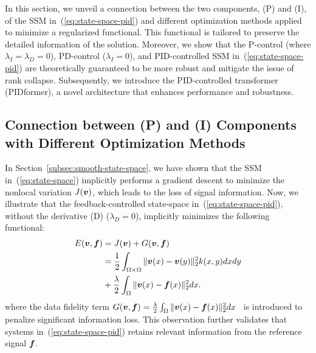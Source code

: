 \vspace{-3mm}
In this section, we unveil a connection between the two components, (P) and (I), of the SSM in~(\ref{eq:state-space-pid}) and different optimization methods applied to minimize a regularized functional. This functional is tailored to preserve the detailed information of the solution. Moreover, we show that the P-control (where $\lambda_I = \lambda_D = 0$), PD-control ($\lambda_I = 0$), and PID-controlled SSM in~(\ref{eq:state-space-pid}) are theoretically guaranteed to be more robust and mitigate the issue of rank collapse. Subsequently, we introduce the PID-controlled transformer (PIDformer), a novel architecture that enhances performance and robustness.

\vspace{-3mm}
\subsection{Connection between (P) and (I) Components with Different Optimization Methods} 

In Section~\ref{subsec:smooth-state-space}, we have shown that the SSM in~(\ref{eq:state-space}) implicitly performs a gradient descent to minimize the nonlocal variation $J({\bm v})$, which leads to the loss of signal information. Now, we illustrate that the feedback-controlled state-space in~(\ref{eq:state-space-pid}), without the derivative (D) ($\lambda_D = 0$), implicitly minimizes the following functional:
\begin{equation}
  \begin{aligned}
    \label{eqn:energy-functional}
    E({\bm v}, {\bm f}) &= J({\bm v}) + G({\bm v},{\bm f}) \\ 
    &= \frac{1}{2} \int_{\Omega \times \Omega} \|{\bm v}(x) - {\bm v}(y)\|_2^2 k(x, y)dx dy \\
    &+ \frac{\lambda}{2}  \int_{\Omega} \|{\bm v}(x) - {\bm f}(x)\|_2^2 dx.
    \end{aligned}  
\end{equation}
where the data fidelity term $G({\bm v},{\bm f}) = \frac{\lambda}{2} \int_{\Omega} \|{\bm v}(x) - {\bm f}(x)\|_2^2 dx$~\cite{Gilboa2008NonlocalOW, Gilboa2007NonlocalLI} is introduced to penalize significant information loss. This observation further validates that systems in~(\ref{eq:state-space-pid}) retains relevant information from the reference signal ${\bm f}$.

